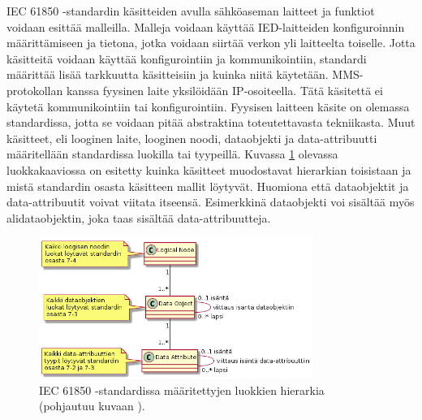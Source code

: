 IEC 61850 -standardin käsitteiden avulla sähköaseman laitteet ja funktiot voidaan esittää malleilla. Malleja voidaan käyttää IED-laitteiden konfiguroinnin määrittämiseen ja tietona, jotka voidaan siirtää verkon yli laitteelta toiselle. Jotta käsitteitä voidaan käyttää konfigurointiin ja kommunikointiin, standardi määrittää lisää tarkkuutta käsitteisiin ja kuinka niitä käytetään. MMS-protokollan kanssa fyysinen laite yksilöidään IP-osoiteella. Tätä käsitettä ei käytetä kommunikointiin tai konfigurointiin. Fyysisen laitteen käsite on olemassa standardissa, jotta se voidaan pitää abstraktina toteutettavasta tekniikasta. Muut käsitteet, eli looginen laite, looginen noodi, dataobjekti ja data-attribuutti määritellään standardissa luokilla tai tyypeillä. Kuvassa \ref{fig:iec61850-class-hierarchy} olevassa luokkakaaviossa on esitetty kuinka käsitteet muodostavat hierarkian toisistaan ja mistä standardin osasta käsitteen mallit löytyvät. Huomiona että dataobjektit ja data-attribuutit voivat viitata itseensä. Esimerkkinä dataobjekti voi sisältää myös alidataobjektin, joka taas sisältää data-attribuutteja.

\begin{figure}[ht!]
	\includegraphics[width=0.8\textwidth]{pictures/iec61850-class-hierarchy.png}
	\caption{IEC 61850 -standardissa määritettyjen luokkien hierarkia (pohjautuu kuvaan \mbox{\cite[s.~17]{IEC61850-7-2}}).}
	\label{fig:iec61850-class-hierarchy}
\end{figure}

